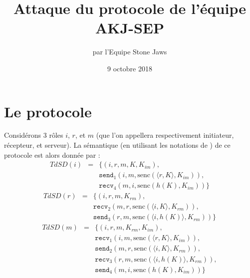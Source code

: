 \documentclass[a4paper,10pt]{article}
\title{Attaque du protocole de l'équipe AKJ-SEP}
\author{par l'Equipe Stone Jaws}
\date{9 octobre 2018}
\begin{document}
\maketitle

\section{Le protocole}

Considérons 3 rôles $i$, $r$, et $m$ (que l'on appellera respectivement initiateur, récepteur, et serveur). La sémantique (en utilisant les notations de \cite{cas}) de ce protocole est alors donnée par :
\begin{eqnarray*}
	TdSD(i) & = & \{ (i,r,m, K, K_{im}), \\
		& & \texttt{send}_1(i,m, \textrm{senc}(\langle r, K \rangle,K_{im}) ),\\
		& & \texttt{recv}_4(m,i, \textrm{senc}(h(K), K_{im}))\}
\end{eqnarray*}
\begin{eqnarray*}
	TdSD(r) & = & \{ (i,r,m, K_{rm}), \\
		& & \texttt{recv}_2(m,r, \textrm{senc}(\langle i, K \rangle,K_{rm}) ),\\
		& & \texttt{send}_3(r,m, \textrm{senc}(\langle i, h(K) \rangle,K_{rm}) )\}
\end{eqnarray*}
\begin{eqnarray*}
	TdSD(m) & = & \{ (i,r,m, K_{rm}, K_{im}), \\
		& & \texttt{recv}_1(i,m, \textrm{senc}(\langle r, K \rangle,K_{im}) ),\\
		& & \texttt{send}_2(m,r, \textrm{senc}(\langle i, K \rangle,K_{rm}) ),\\
		& & \texttt{recv}_3(r,m, \textrm{senc}(\langle i, h(K) \rangle,K_{rm}) ),\\
		& & \texttt{send}_4(m,i, \textrm{senc}(h(K), K_{im}))\}
\end{eqnarray*}
\end{document}
